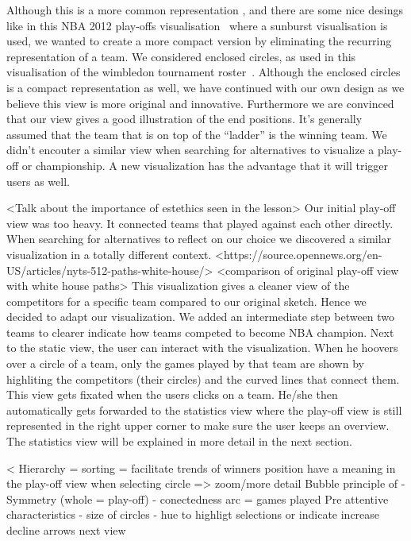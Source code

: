 \documentclass{sigchi}
\begin{document}
Although this is a more common representation , and there are some nice desings like in this NBA 2012 play-offs visualisation~\cite{tournamentladder} where a sunburst visualisation is used, we wanted to create a more compact version by eliminating the recurring representation of a team. We considered enclosed circles, as used in this visualisation of the wimbledon tournament roster~\cite{enclosedcircles}.
Although the enclosed circles is a compact representation as well, we have continued 
with our own design as we believe this view is more original and innovative. Furthermore we are convinced that our view gives a good illustration of the end positions. It's generally assumed that the team that is on top of the ``ladder'' is the winning team. We didn't encouter a similar view when searching for alternatives to visualize a play-off or championship. A new visualization has the advantage that it will trigger users as well.

<Talk about the importance of estethics seen in the lesson>
Our initial play-off view was too heavy. It connected teams that played against
each other directly. When searching for alternatives to reflect on our choice we
discovered a similar visualization in a totally different context. 
<https://source.opennews.org/en-US/articles/nyts-512-paths-white-house/>
<comparison of original play-off view with white house paths>
This visualization gives a cleaner view of the competitors for a specific team
compared to our original sketch. Hence we decided to adapt our visualization. We
added an intermediate step between two teams to clearer indicate how teams competed
to become NBA champion.
Next to the static view, the user can interact with the visualization. When he 
hoovers over a circle of a team, only the games played by that team are shown by highliting the 
competitors (their circles) and the curved lines that connect them. This view gets 
fixated when the users clicks on a team.
He/she then automatically gets forwarded to the statistics view where the play-off 
view is still represented in the right upper corner to make sure the user keeps
an overview. The statistics view will be explained in more detail in the next section.


< Hierarchy = sorting = facilitate trends of winners
position have a meaning in the play-off view
when selecting circle => zoom/more detail
Bubble principle of 
- Symmetry (whole = play-off)
- conectedness arc = games played
Pre attentive characteristics
- size of circles
- hue to highligt selections or indicate increase decline arrows next view
\end{document}

